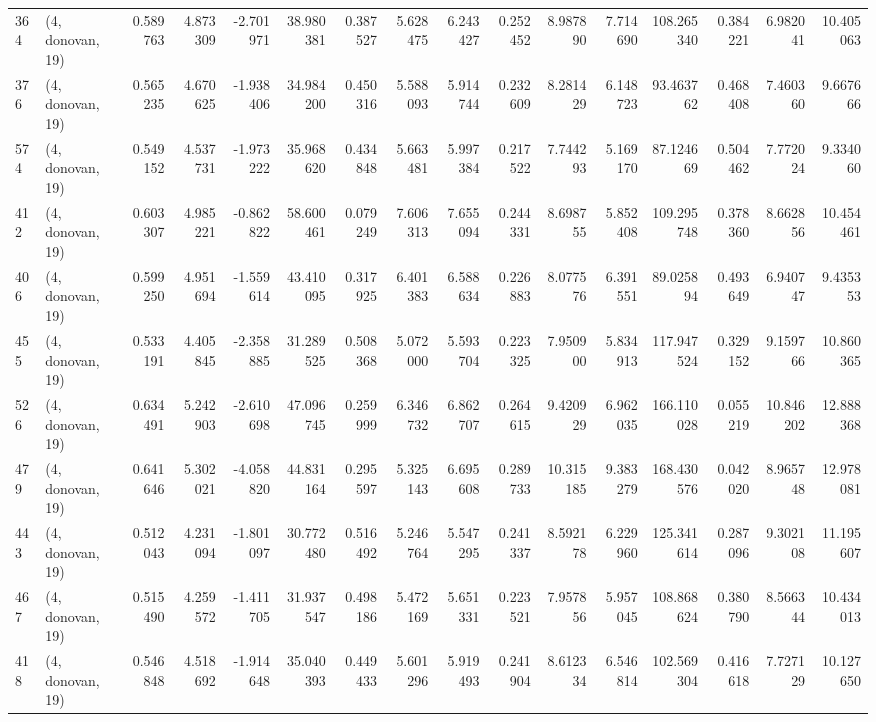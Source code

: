 \begin{tabular}{llrrrrrrrrrrrrrr}
364 &  (4, donovan, 19) &   0.589763 &   4.873309 &  -2.701971 &    38.980381 &   0.387527 &   5.628475 &   6.243427 &  0.252452 &   8.987890 &   7.714690 &    108.265340 &   0.384221 &   6.982041 &   10.405063 \\
376 &  (4, donovan, 19) &   0.565235 &   4.670625 &  -1.938406 &    34.984200 &   0.450316 &   5.588093 &   5.914744 &  0.232609 &   8.281429 &   6.148723 &     93.463762 &   0.468408 &   7.460360 &    9.667666 \\
574 &  (4, donovan, 19) &   0.549152 &   4.537731 &  -1.973222 &    35.968620 &   0.434848 &   5.663481 &   5.997384 &  0.217522 &   7.744293 &   5.169170 &     87.124669 &   0.504462 &   7.772024 &    9.334060 \\
412 &  (4, donovan, 19) &   0.603307 &   4.985221 &  -0.862822 &    58.600461 &   0.079249 &   7.606313 &   7.655094 &  0.244331 &   8.698755 &   5.852408 &    109.295748 &   0.378360 &   8.662856 &   10.454461 \\
406 &  (4, donovan, 19) &   0.599250 &   4.951694 &  -1.559614 &    43.410095 &   0.317925 &   6.401383 &   6.588634 &  0.226883 &   8.077576 &   6.391551 &     89.025894 &   0.493649 &   6.940747 &    9.435353 \\
455 &  (4, donovan, 19) &   0.533191 &   4.405845 &  -2.358885 &    31.289525 &   0.508368 &   5.072000 &   5.593704 &  0.223325 &   7.950900 &   5.834913 &    117.947524 &   0.329152 &   9.159766 &   10.860365 \\
526 &  (4, donovan, 19) &   0.634491 &   5.242903 &  -2.610698 &    47.096745 &   0.259999 &   6.346732 &   6.862707 &  0.264615 &   9.420929 &   6.962035 &    166.110028 &   0.055219 &  10.846202 &   12.888368 \\
479 &  (4, donovan, 19) &   0.641646 &   5.302021 &  -4.058820 &    44.831164 &   0.295597 &   5.325143 &   6.695608 &  0.289733 &  10.315185 &   9.383279 &    168.430576 &   0.042020 &   8.965748 &   12.978081 \\
443 &  (4, donovan, 19) &   0.512043 &   4.231094 &  -1.801097 &    30.772480 &   0.516492 &   5.246764 &   5.547295 &  0.241337 &   8.592178 &   6.229960 &    125.341614 &   0.287096 &   9.302108 &   11.195607 \\
467 &  (4, donovan, 19) &   0.515490 &   4.259572 &  -1.411705 &    31.937547 &   0.498186 &   5.472169 &   5.651331 &  0.223521 &   7.957856 &   5.957045 &    108.868624 &   0.380790 &   8.566344 &   10.434013 \\
418 &  (4, donovan, 19) &   0.546848 &   4.518692 &  -1.914648 &    35.040393 &   0.449433 &   5.601296 &   5.919493 &  0.241904 &   8.612334 &   6.546814 &    102.569304 &   0.416618 &   7.727129 &   10.127650 \\

\end{tabular}
